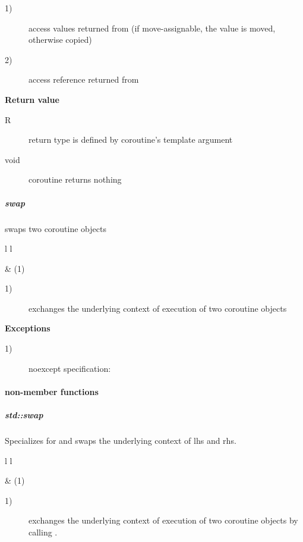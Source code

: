 \begin{description}
    \item[1)] access values returned from \corofunction (if move-assignable, the
              value is moved, otherwise copied)
    \item[2)] access reference returned from \corofunction
\end{description}

{\bf Return value}
\begin{description}
    \item[R] return type is defined by coroutine's template argument
    \item[void] coroutine returns nothing
\end{description}

\subparagraph*{swap}
swaps two coroutine objects\\

\begin{tabular}{ l l }
    \midrule

     & (1)\\

    \midrule
\end{tabular}

\begin{description}
    \item[1)] exchanges the underlying context of execution of two coroutine
              objects
\end{description}

{\bf Exceptions}
\begin{description}
    \item[1)] noexcept specification: 
\end{description}

\paragraph*{non-member functions}
\subparagraph*{std::swap}
Specializes  for \pullcoro and swaps the underlying context of
lhs and rhs.

\begin{tabular}{ l l }
    \midrule

     & (1)\\

    \midrule
\end{tabular}

\begin{description}
    \item[1)] exchanges the underlying context of execution of two coroutine
              objects by calling . 
\end{description}

